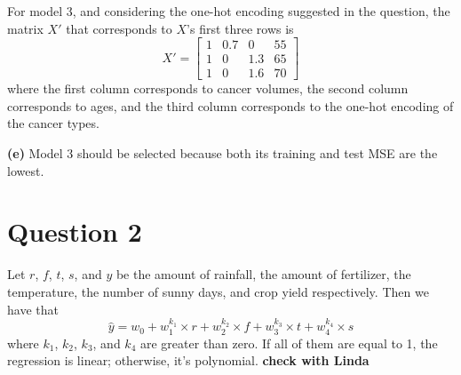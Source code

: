 \documentclass[leqno]{article}
\begin{document}
\noindent For model 3, and considering the one-hot encoding suggested in the question, the matrix $X'$ that corresponds to $X$'s first three rows is
\[
X'=
  \begin{bmatrix}
    1 & 0.7 & 0 & 55\\
    1 & 0 & 1.3 & 65 \\
    1 & 0 & 1.6 & 70
  \end{bmatrix}
\]
where the first column corresponds to cancer volumes, the second column corresponds to ages, and the third column corresponds to the one-hot encoding 
of the cancer types.

\hfill

\noindent \textbf{(e)} Model 3 should be selected because both its training and test MSE are the lowest.


\hfill

\section*{Question 2} Let $r$, $f$, $t$, $s$, and $y$ be the amount of rainfall, the amount of fertilizer, the temperature, the number of sunny days, and 
crop yield respectively. Then we have that
\begin{equation*}
\hat{y} = w_0 + w_1^{k_1} \times r + w_2^{k_2} \times f + w_3^{k_3} \times t + w_4^{k_4} \times s
\end{equation*}
where $k_1$, $k_2$, $k_3$, and $k_4$ are greater than zero. If all of them are equal to 1, the regression is linear; otherwise, it's polynomial.
\textbf{check with Linda}
\end{document}
